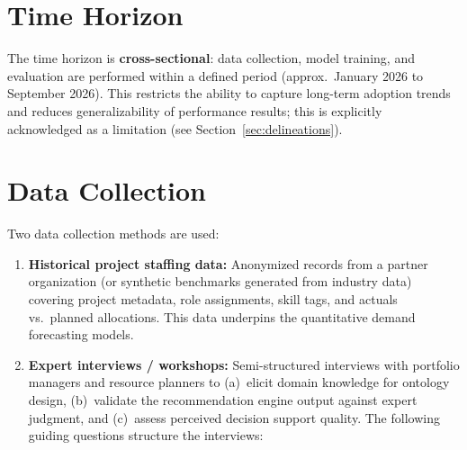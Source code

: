 \section{Time Horizon}
\label{sec:time_horizon}

The time horizon is \textbf{cross-sectional}: data collection, model training, and evaluation
are performed within a defined period (approx.\ January 2026 to September 2026). This restricts
the ability to capture long-term adoption trends and reduces generalizability of performance
results; this is explicitly acknowledged as a limitation (see Section~\ref{sec:delineations}).

\section{Data Collection}
\label{sec:data_collection}

Two data collection methods are used:

\begin{enumerate}
  \item \textbf{Historical project staffing data:} Anonymized records from a partner
        organization (or synthetic benchmarks generated from industry data) covering project
        metadata, role assignments, skill tags, and actuals vs.\ planned allocations. This
        data underpins the quantitative demand forecasting models.

  \item \textbf{Expert interviews / workshops:} Semi-structured interviews with portfolio
        managers and resource planners to (a)~elicit domain knowledge for ontology design,
        (b)~validate the recommendation engine output against expert judgment, and (c)~assess
        perceived decision support quality. The following guiding questions structure the
        interviews:
\end{enumerate}

